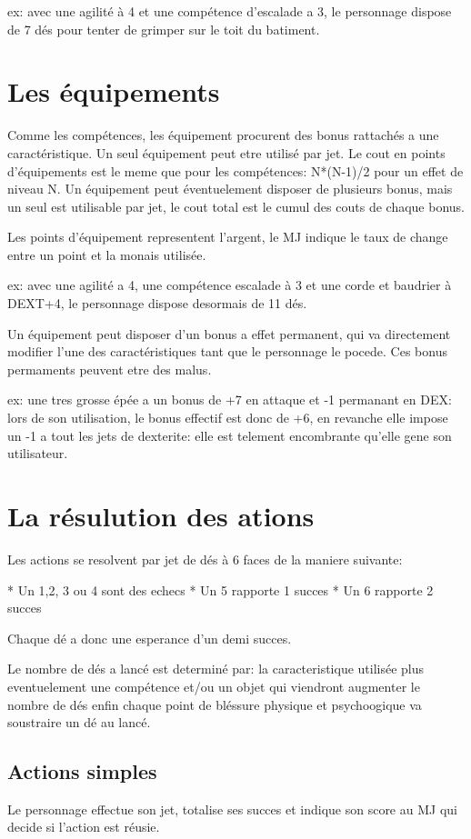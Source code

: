 ex: avec une agilité à 4 et une compétence d'escalade a 3, le personnage dispose de 7 dés pour tenter de grimper sur le toit du batiment.

\section{Les équipements}

Comme les compétences, les équipement procurent des bonus rattachés a une caractéristique. Un seul équipement peut etre utilisé par jet. Le cout en points d'équipements est le meme que pour les compétences: N*(N-1)/2 pour un effet de niveau N. Un équipement peut éventuelement disposer de plusieurs bonus, mais un seul est utilisable par jet, le cout total est le cumul des couts de chaque bonus. 

Les points d'équipement representent l'argent, le MJ indique le taux de change entre un point et la monais utilisée.

ex: avec une agilité a 4, une compétence escalade à 3 et une corde et baudrier à DEXT+4, le personnage dispose desormais de 11 dés.

Un équipement peut disposer d'un bonus a effet permanent, qui va directement modifier l'une des caractéristiques tant que le personnage le pocede. Ces bonus permaments peuvent etre des malus. 

ex: une tres grosse épée a un bonus de +7 en attaque et -1 permanant en DEX: lors de son utilisation, le bonus effectif est donc de +6, en revanche elle impose un -1 a tout les jets de dexterite: elle est telement encombrante qu'elle gene son utilisateur. 

\section{La résulution des ations}
	
Les actions se resolvent par jet de dés à 6 faces de la maniere suivante: 

* Un 1,2, 3 ou 4 sont des echecs
* Un 5 rapporte 1 succes
* Un 6 rapporte 2 succes
	
Chaque dé a donc une esperance d'un demi succes.
	
Le nombre de dés a lancé est determiné par: la caracteristique utilisée plus eventuelement une compétence et/ou un objet qui viendront augmenter le nombre de dés enfin chaque point de bléssure physique et psychoogique va soustraire un dé au lancé.
	
\subsection{Actions simples}
Le personnage effectue son jet, totalise ses succes et indique son score au MJ qui decide si l'action est réusie.
	
